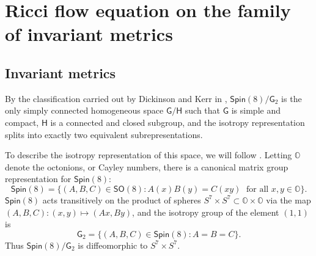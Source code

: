 \documentclass{amsart}
\numberwithin{equation}{section}
\theoremstyle{plain}
\theoremstyle{definition}
\theoremstyle{remark}
\numberwithin{table}{section}
\newcommand{\gG}{\mathsf{G}}
\newcommand{\gH}{\mathsf{H}}
\newcommand{\SO}{\mathsf{SO}}
\newcommand{\Spin}{\mathsf{Spin}}
\newcommand{\bO}{\mathbb{O}}
\begin{document}


\section{Ricci flow equation on the family of invariant metrics}
\label{sec:invariantmetrics}

\subsection{Invariant metrics}
    By the classification carried out by Dickinson and Kerr in \cite{DickinsonKerr08}, $\Spin(8)/\gG_2$ is the only simply connected homogeneous space $\gG/\gH$ such that $\gG$ is simple and compact, $\gH$ is a connected and closed subgroup, and the isotropy representation splits into exactly two equivalent subrepresentations. 

    To describe the isotropy representation of this space, we will follow \cite{Kerr98,Kerin11}.
    Letting $\bO$ denote the octonions, or Cayley numbers, there is a canonical matrix group representation for $\Spin(8)$: 
    \[
        \Spin(8) = \{(A,B,C) \in \SO(8) : A(x) B(y) = C(xy) \; \text{ for all } x, y \in \bO \}.
    \]
    $\Spin(8)$ acts transitively on the product of spheres $S^7 \times S^7 \subset \bO \times \bO$ via the map $(A,B,C) : (x,y) \mapsto (Ax,By)$, and the isotropy group of the element $(1,1)$ is 
    \[
        \gG_2 = \{ (A,B,C) \in \Spin(8) : A = B = C \}.
    \]
    Thus $\Spin(8)/\gG_2$ is diffeomorphic to $S^7 \times S^7$.
\end{document}
